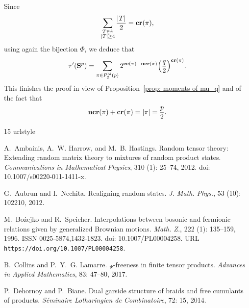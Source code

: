 \documentclass[12pt,reqno]{amsart}
\theoremstyle{plain}
\newcommand{\1}{\mathbf{1}}
\newcommand{\crblocks}{\operatorname{\bf cr}}
\newcommand{\ccblocks}{\operatorname{\bf cc}}
\newcommand{\ncrblocks}{\operatorname{\bf ncr}}
\begin{document}
Since     
$$
\sum_{\substack{T \in \hat{\pi}\\ |T| \ge 4}}\frac{|T|}{2}=\crblocks(\pi),
$$
using again the bijection $\Phi$, we deduce that 
\begin{align*}
    \tau'({\bf{S}}^{p})= \sum_{\pi \in P_2^{\operatorname{bi}}(p)} 2^{\ccblocks(\pi)-\ncrblocks(\pi)} \Big(\frac{q}{2}\Big)^{\crblocks(\pi)}. 
\end{align*} 
This finishes the proof in view of Proposition~\ref{prop: moments of mu_q} and of the fact that
\begin{align*}
    \ncrblocks(\pi)+\crblocks(\pi)=|\pi|=\frac{p}{2}.
\end{align*}





\begin{thebibliography}{15}
\providecommand{\natexlab}[1]{#1}
\providecommand{\url}[1]{\texttt{#1}}
\expandafter\ifx\csname urlstyle\endcsname\relax
  \providecommand{\doi}[1]{doi: #1}\else
  \providecommand{\doi}{doi: \begingroup \urlstyle{rm}\Url}\fi

A.~Ambainis, A.~W. Harrow, and M.~B. Hastings.
\newblock Random tensor theory: Extending random matrix theory to mixtures of
  random product states.
\newblock \emph{Communications in Mathematical Physics}, 310
  (1): 25--74, 2012.
\newblock \doi{10.1007/s00220-011-1411-x}.

G.~Aubrun and I.~Nechita.
\newblock Realigning random states.
\newblock \emph{J. Math. Phys.}, 53 (10): 102210, 2012.

M.~Bo\.{z}ejko and R.~Speicher.
\newblock Interpolations between bosonic and fermionic relations given by
  generalized {B}rownian motions.
\newblock \emph{Math. Z.}, 222 (1): 135--159, 1996.
\newblock ISSN 0025-5874,1432-1823.
\newblock \doi{10.1007/PL00004258}.
\newblock URL \url{https://doi.org/10.1007/PL00004258}.

B.~Collins and P.~Y.~G. Lamarre.
\newblock ⁎-freeness in finite tensor products.
\newblock \emph{Advances in Applied Mathematics}, 83: 47--80, 2017.

P.~Dehornoy and P.~Biane.
\newblock Dual garside structure of braids and free cumulants of products.
\newblock \emph{S{\'e}minaire Lotharingien de Combinatoire}, 72: 15,
  2014.


\end{thebibliography}
\end{document}

